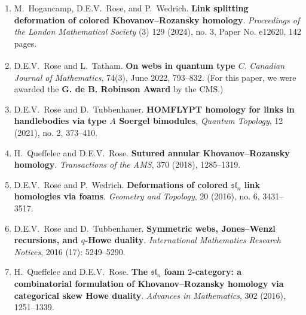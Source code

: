 \documentclass[10pt]{article}
\begin{document}
\begin{enumerate}
\item 
M.~Hogancamp, D.E.V.~Rose, and P.~Wedrich.
{\bf Link splitting deformation of colored Khovanov--Rozansky homology}.
\emph{Proceedings of the London Mathematical Society}
(3) 129 (2024), no. 3, Paper No. e12620, 142 pages.

\item 
D.E.V.~Rose and L.~Tatham\textsuperscript{\textdagger}.
{\bf On webs in quantum type $C$}.
\emph{Canadian Journal of Mathematics}, 74(3), June 2022, 793--832.
(For this paper, we were awarded the \textbf{G. de B. Robinson Award} by the CMS.)

\item 
D.E.V.~Rose and D.~Tubbenhauer.
{\bf HOMFLYPT homology for links in handlebodies via type $A$ Soergel bimodules},
\emph{Quantum Topology}, 12 (2021), no. 2, 373--410. %

\item 
H.~Queffelec and D.E.V.~Rose.
{\bf Sutured annular Khovanov--Rozansky homology}.
\emph{Transactions of the AMS}, 370 (2018), 1285--1319. %

\item 
D.E.V.~Rose and P.~Wedrich.
{\bf Deformations of colored $\mathfrak{sl}_n$ link homologies via foams}.
\emph{Geometry and Topology}, 20 (2016), no. 6, 3431--3517. %

\item 
D.E.V.~Rose and D.~Tubbenhauer.
{\bf Symmetric webs, Jones--Wenzl recursions, and $q$-Howe duality}.
\emph{International Mathematics Research Notices}, 2016 (17): 5249--5290. %

\item 
H.~Queffelec and D.E.V.~Rose.
{\bf The $\mathfrak{sl}_n$ foam $2$-category: a combinatorial formulation of Khovanov--Rozansky
homology via categorical skew Howe duality}.
\emph{Advances in Mathematics}, 302 (2016), 1251--1339. %


\end{enumerate}
\end{document}
